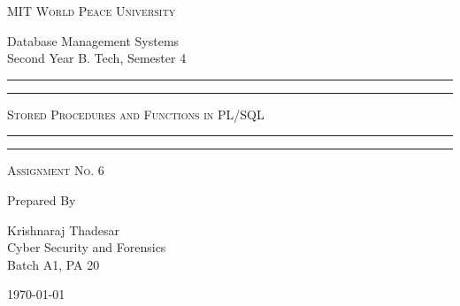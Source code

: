 \documentclass[11pt]{article}
\begin{document}
\begin{titlepage}
    \centering


    \huge\textsc{
        MIT World Peace University
    }\\

    \vspace{0.75\baselineskip} %

    \LARGE{
        Database Management Systems\\
        Second Year B. Tech, Semester 4
    }

    \vfill %


    \rule{\textwidth}{1.6pt}\vspace*{-\baselineskip}\vspace*{2pt}
    \rule{\textwidth}{0.6pt}
    \vspace{0.75\baselineskip} %



    \huge{\textsc{
            Stored Procedures and Functions in PL/SQL
        }} \\



    \vspace{0.5\baselineskip} %
    \rule{\textwidth}{0.6pt}\vspace*{-\baselineskip}\vspace*{2.8pt}
    \rule{\textwidth}{1.6pt}

    \vspace{1\baselineskip} %


    \LARGE\textsc{
        Assignment No. 6
    } %
    \vfill


    Prepared By
    \vspace{0.5\baselineskip} %

    \Large{
        Krishnaraj Thadesar \\
        Cyber Security and Forensics\\
        Batch A1, PA 20
    }


    \vspace{0.5\baselineskip} %
    \today

\end{titlepage}
\end{document}
